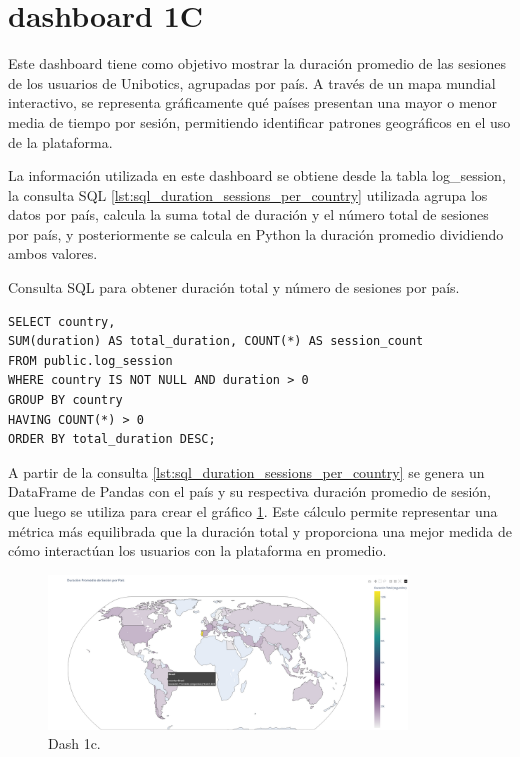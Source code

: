 \documentclass[a4paper, 12pt]{book}
\begin{document}
\section{dashboard 1C}
    \label{sec:dash1c}


Este dashboard tiene como objetivo mostrar la duración promedio de las sesiones de los usuarios de Unibotics, agrupadas por país. A través de un mapa mundial interactivo, se representa gráficamente qué países presentan una mayor o menor media de tiempo por sesión, permitiendo identificar patrones geográficos en el uso de la plataforma.

La información utilizada en este dashboard se obtiene desde la tabla log\_session, la consulta SQL \ref{lst:sql_duration_sessions_per_country} utilizada agrupa los datos por país, calcula la suma total de duración y el número total de sesiones por país, y posteriormente se calcula en Python la duración promedio dividiendo ambos valores.

\begin{listing}[h!]
    \caption{Consulta SQL para obtener duración total y número de sesiones por país.}{}
    \label{lst:sql_duration_sessions_per_country}
    \begin{verbatim}
SELECT country, 
SUM(duration) AS total_duration, COUNT(*) AS session_count 
FROM public.log_session
WHERE country IS NOT NULL AND duration > 0
GROUP BY country
HAVING COUNT(*) > 0  
ORDER BY total_duration DESC;
    \end{verbatim}
\end{listing}


A partir de la consulta \ref{lst:sql_duration_sessions_per_country} se genera un DataFrame de Pandas con el país y su respectiva duración promedio de sesión, que luego se utiliza para crear el gráfico \ref{fig:1c}. Este cálculo permite representar una métrica más equilibrada que la duración total y proporciona una mejor medida de cómo interactúan los usuarios con la plataforma en promedio.

\begin{figure}
  \centering
  \includegraphics[width=0.85\textwidth, keepaspectratio]{img/1c.png}
  \caption{Dash 1c.}\label{fig:1c}
\end{figure}
\end{document}
